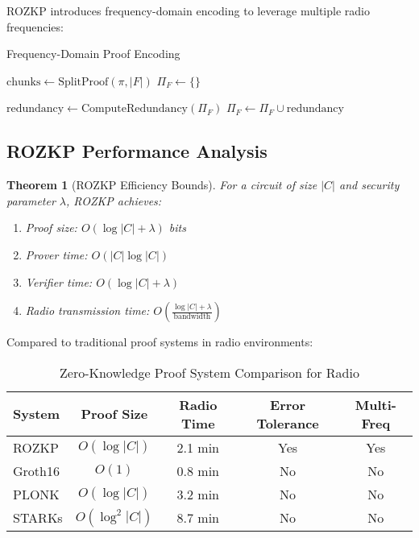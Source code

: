 \documentclass[11pt,a4paper]{article}
\newtheorem{theorem}{Theorem}[section]
\begin{document}
ROZKP introduces frequency-domain encoding to leverage multiple radio frequencies:

\begin{algorithm}[H]
\SetAlgoLined
{}
\caption{Frequency-Domain Proof Encoding}

$\text{chunks} \leftarrow \text{SplitProof}(\pi, |F|)$\;
$\Pi_F \leftarrow \{\}$\;


$\text{redundancy} \leftarrow \text{ComputeRedundancy}(\Pi_F)$\;
$\Pi_F \leftarrow \Pi_F \cup \text{redundancy}$\;
\;
\end{algorithm}

\subsection{ROZKP Performance Analysis}

\begin{theorem}[ROZKP Efficiency Bounds]
For a circuit of size $|C|$ and security parameter $\lambda$, ROZKP achieves:
\begin{enumerate}
\item Proof size: $O(\log |C| + \lambda)$ bits
\item Prover time: $O(|C| \log |C|)$
\item Verifier time: $O(\log |C| + \lambda)$
\item Radio transmission time: $O(\frac{\log |C| + \lambda}{\text{bandwidth}})$
\end{enumerate}
\end{theorem}

Compared to traditional proof systems in radio environments:

\begin{table}[h]
\centering
\caption{Zero-Knowledge Proof System Comparison for Radio}
\begin{tabular}{|l|c|c|c|c|}
\hline
\textbf{System} & \textbf{Proof Size} & \textbf{Radio Time} & \textbf{Error Tolerance} & \textbf{Multi-Freq} \\
\hline
ROZKP & $O(\log |C|)$ & 2.1 min & Yes & Yes \\
\hline
Groth16 & $O(1)$ & 0.8 min & No & No \\
\hline
PLONK & $O(\log |C|)$ & 3.2 min & No & No \\
\hline
STARKs & $O(\log^2 |C|)$ & 8.7 min & No & No \\
\hline
\end{tabular}
\end{table}
\end{document}
